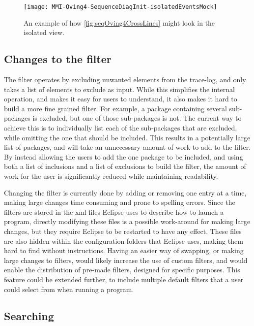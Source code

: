 \begin{figure}[H]
	\centering
	\texttt{[image: MMI-Oving4-SequenceDiagInit-isolatedEventsMock]}
	\caption{An example of how \cref{fig:seqOving4CrossLines} might look in the isolated view.}
	\label{fig:seqOving4IsolatedMock}
\end{figure}

\subsection{Changes to the filter}\label{jiveSuggestionsFilter}

The filter operates by excluding unwanted elements from the trace-log, and only takes a list of elements to exclude as input.
While this simplifies the internal operation, and makes it easy for users to understand, it also makes it hard to build a more fine grained filter.
For example, a package containing several sub-packages is excluded, but one of those sub-packages is not.
The current way to achieve this is to individually list each of the sub-packages that are excluded, while omitting the one that should be included.
This results in a potentially large list of packages, and will take an unnecessary amount of work to add to the filter.
By instead allowing the users to add the one package to be included, and using both a list of inclusions and a list of exclusions to build the filter, the amount of work for the user is significantly reduced while maintaining readability.

Changing the filter is currently done by adding or removing one entry at a time, making large changes time consuming and prone to spelling errors.
Since the filters are stored in the \gls{xml}-files Eclipse uses to describe how to launch a program, directly modifying these files is a possible work-around for making large changes, but they require Eclipse to be restarted to have any effect.
These files are also hidden within the configuration folders that Eclipse uses, making them hard to find without instructions.
Having an easier way of swapping, or making large changes to filters, would likely increase the use of custom filters, and would enable the distribution of pre-made filters, designed for specific purposes.
This feature could be extended further, to include multiple default filters that a user could select from when running a program.

\subsection{Searching}\label{jiveSuggestionsSearch}

